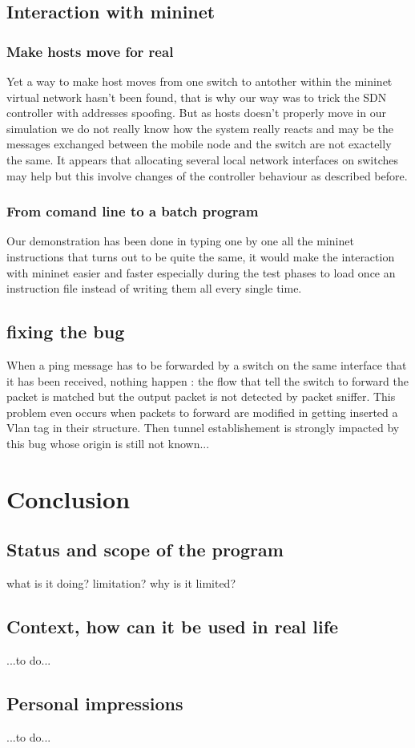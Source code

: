 \documentclass{article}
\begin{document}
\subsection{Interaction with mininet}

\subsubsection{Make hosts move for real}
Yet a way to make host moves from one switch to antother within the
mininet virtual network hasn't been found, that is why our way was to
trick the SDN controller with addresses spoofing. But as hosts doesn't
properly move in our simulation we do not really know how the system
really reacts and may be the messages exchanged between the mobile
node and the switch are not exactelly the same. It appears that
allocating several local network interfaces on switches may help but
this involve changes of the controller behaviour as described
before.

\subsubsection{From comand line to a batch program}
Our demonstration has been done in typing one by one all the mininet
instructions that turns out to be quite the same, it would make the
interaction with mininet easier and faster especially during the test
phases to load once an instruction file instead of writing them all
every single time. 
 
\subsection{fixing the bug}
When a ping message has to be forwarded by a switch on the same
interface that it has been received, nothing happen : the flow that
tell the switch to forward the packet is matched but the output packet
is not detected by packet sniffer. This problem even occurs when
packets to forward are modified in getting inserted a Vlan tag in
their structure. Then tunnel establishement is strongly impacted by
this bug whose origin is still not known...

\section{Conclusion}

\subsection{Status and scope of the program}
what is it doing? limitation? why is it limited?

\subsection{Context, how can it be used in real life}
...to do...
\subsection{Personal impressions}
...to do...
\end{document}
